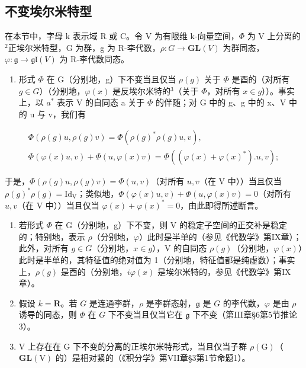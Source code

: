 \subsection{不变埃尔米特型}

在本节中，字母 k 表示域 R 或 C。令 V 为有限维 k-向量空间，\(\Phi\) 为 V 上分离的\(^{2}\)正埃尔米特型，G 为群，g 为 R-李代数，\(\rho: G \to \mathbf{GL}(V)\) 为群同态，\(\varphi: \mathfrak{g} \to \mathfrak{gl}(V)\) 为 R-李代数同态。

\begin{enumerate}
\def\labelenumi{\alph{enumi})}
\tightlist
\item
  形式 \(\Phi\) 在 G（分别地，g）下不变当且仅当 \(\rho(g)\) 关于 \(\Phi\) 是酉的（对所有 \(g \in G\)）（分别地，\(\varphi(x)\) 是反埃尔米特的\(^{3}\)（关于 \(\Phi\)，对所有 \(x \in g\)））。事实上，以 \(a^{*}\) 表示 V 的自同态 a 关于 \(\Phi\) 的伴随；对 G 中的 g、g 中的 x、V 中的 u 与 v，我们有
\end{enumerate}

\[
\begin{array}{c} \Phi (\rho (g) u, \rho (g) v) = \Phi (\rho (g) ^ {*} \rho (g) u, v), \\ \Phi (\varphi (x) u, v) + \Phi (u, \varphi (x) v) = \Phi ((\varphi (x) + \varphi (x) ^ {*}). u, v); \end{array}
\]

于是，\(\Phi(\rho(g)u,\rho(g)v)=\Phi(u,v)\)（对所有 \(u,v\)（在 V 中））当且仅当 \(\rho(g)^{*}\rho(g)=\mathrm{Id}_{\mathrm{V}}\)；类似地，\(\Phi(\varphi(x)u,v)+\Phi(u,\varphi(x)v)=0\)（对所有 \(u,v\)（在 V 中））当且仅当 \(\varphi(x)+\varphi(x)^{*}=0\)，由此即得所述断言。

\begin{enumerate}
\def\labelenumi{\alph{enumi})}
\setcounter{enumi}{1}
\item
  若形式 \(\varPhi\) 在 G（分别地，g）下不变，则 V 的稳定子空间的正交补是稳定的；特别地，表示 \(\rho\)（分别地，\(\varphi\)）此时是半单的（参见《代数学》第IX章）；此外，对所有 \(g \in G\)（分别地，\(x \in g\)），V 的自同态 \(\rho(g)\)（分别地，\(\varphi(x)\)）此时是半单的，其特征值的绝对值为 1（分别地，特征值都是纯虚数）；事实上，\(\rho(g)\) 是酉的（分别地，\(i\varphi(x)\) 是埃尔米特的，参见《代数学》第IX章）。
\item
  假设 \(k = \mathbf{R}\)。若 \(G\) 是连通李群，\(\rho\) 是李群态射，\(\mathfrak{g}\) 是 \(G\) 的李代数，\(\varphi\) 是由 \(\rho\) 诱导的同态，则 \(\varPhi\) 在 \(G\) 下不变当且仅当它在 \(\mathfrak{g}\) 下不变（第III章§6第5节推论3）。
\item
  V 上存在在 G 下不变的分离的正埃尔米特形式，当且仅当子群 \(\rho(\mathrm{G})\)（\(\mathbf{GL}(\mathrm{V})\) 的）是相对紧的（《积分学》第VII章§3第1节命题1）。
\end{enumerate}


